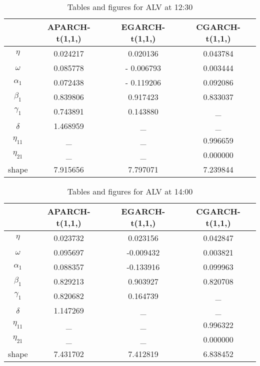 \begin{table}[!h]
 \small
  \caption{Tables and figures for ALV at 12:30}
  \label{coefalv1230}
  \centering
  \vspace{2ex} 
\begin{tabular}{c|c|c|c}
\toprule
	&APARCH-t(1,1,)&	EGARCH-t(1,1,)&	CGARCH-t(1,1,)\\
\midrule
\hline
$\eta$      &0.024217	&0.020136	&0.043784\\
$\omega$    &0.085778	&- 0.006793	&0.003444\\
$\alpha_1$  &0.072438	&- 0.119206	&0.092086\\
$\beta_1$   &0.839806	&0.917423	&0.833037\\
$\gamma_1$  &0.743891	&0.143880	&\_      \\
$\delta$    &1.468959	&\_			&\_      \\
$\eta_{11}$ &\_			&\_			&0.996659\\
$\eta_{21}$ &\_			&\_			&0.000000\\
shape		&7.915656	&7.797071	&7.239844\\
\bottomrule

\end{tabular}
\end{table}



\begin{table}[!h]
 \small
  \caption{Tables and figures for ALV at 14:00}
  \label{coefalv1400}
  \centering
  \vspace{2ex} 
\begin{tabular}{c|c|c|c}
\toprule
	&APARCH-t(1,1,)&	EGARCH-t(1,1,)&	CGARCH-t(1,1,)\\
\midrule
\hline
$\eta$        &0.023732	&0.023156  	&0.042847 \\
$\omega$      &0.095697	&-0.009432	&0.003821 \\
$\alpha_1$    &0.088357	&-0.133916	&0.099963 \\
$\beta_1$     &0.829213	&0.903927	&0.820708 \\
$\gamma_1$    &0.820682	&0.164739	&\_       \\
$\delta$      &1.147269	&\_			&\_       \\
$\eta_{11}$   &\_		&\_			&0.996322 \\
$\eta_{21}$   &\_		&\_			&0.000000 \\
shape		  &7.431702	&7.412819	&6.838452 \\
\bottomrule

\end{tabular}
\end{table}

